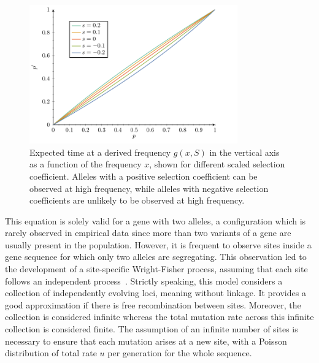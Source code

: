 \begin{figure}[H]
    \centering
    \includegraphics[width=0.8\textwidth, page=4] {figures.pdf}
    \caption[Expected time at a derived frequency]{
    Expected time at a derived frequency $g(x, S)$ in the vertical axis as a function of the frequency $x$, shown for different scaled selection coefficient.
    Alleles with a positive selection coefficient can be observed at high frequency, while alleles with negative selection coefficients are unlikely to be observed at high frequency.}
    \label{fig:expected-time-at-f}
\end{figure}

This equation is solely valid for a gene with two alleles, a configuration which is rarely observed in empirical data since more than two variants of a gene are usually present in the population.
However, it is frequent to observe sites inside a gene sequence for which only two alleles are segregating.
This observation led to the development of a site-specific Wright-Fisher process, assuming that each site follows an independent process~\citep{Sawyer1992}.
Strictly speaking, this model considers a collection of independently evolving loci, meaning without linkage.
It provides a good approximation if there is free recombination between sites.
Moreover, the collection is considered infinite whereas the total mutation rate across this infinite collection is considered finite.
The assumption of an infinite number of sites is necessary to ensure that each mutation arises at a new site, with a Poisson distribution of total rate $u$ per generation for the whole sequence.

